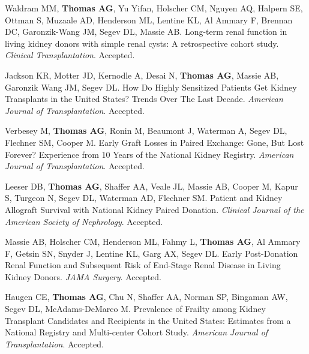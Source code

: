 \documentclass[10pt]{article}
\makeatletter
\newlength{\bibhang}
\newlength{\bibsep}
 {\@listi \global\bibsep\itemsep \global\advance\bibsep by\parsep}
\newenvironment{bibenum*}
  {\renewcommand\labelenumi{[\theenumi]}%
   \etaremune[
     topsep=0pt,
     itemsep=\bibsep,
     parsep=0pt,partopsep=0pt,
     itemindent=-\bibhang,
     leftmargin={\bibhang+\widthof{[999]}}]}
  {\endetaremune}
\newcommand{\pmid}[1]{PMID:\href{https://www.ncbi.nlm.nih.gov/pubmed/#1}{#1}}
\makeatother
\begin{document}
\begin{bibenum*}

\item Waldram MM\dag, \textbf{Thomas AG\dag}, Yu Yifan, Holscher CM,
  Nguyen AQ, Halpern SE, Ottman S, Muzaale AD, Henderson ML, Lentine KL,
  Al Ammary F, Brennan DC, Garonzik-Wang JM, Segev DL, Massie AB.
  Long-term renal function in living kidney donors with simple renal cysts:
  A retrospective cohort study.
  \emph{Clinical Transplantation}. Accepted.

\item Jackson KR\dag, Motter JD\dag, Kernodle A, Desai N, \textbf{Thomas AG},
 Massie AB, Garonzik Wang JM, Segev DL.
 How Do Highly Sensitized Patients Get Kidney Transplants in the
 United States? Trends Over The Last Decade.
  \emph{American Journal of Transplantation}. Accepted.

\item Verbesey M, \textbf{Thomas AG}, Ronin M, Beaumont J, Waterman A,
  Segev DL, Flechner SM, Cooper M. Early Graft Losses in Paired Exchange:
  Gone, But Lost Forever? Experience from 10 Years of the
  National Kidney Registry.
  \emph{American Journal of Transplantation}. Accepted.

\item Leeser DB, \textbf{Thomas AG}, Shaffer AA, Veale JL,
  Massie AB, Cooper M,
  Kapur S, Turgeon N, Segev DL, Waterman AD, Flechner SM.
  Patient and Kidney Allograft Survival with National Kidney Paired Donation.
  \emph{Clinical Journal of the American Society of Nephrology}. Accepted.

\item Massie AB, Holscher CM, Henderson ML, Fahmy L, \textbf{Thomas AG},
  Al Ammary F, Getsin SN, Snyder J, Lentine KL, Garg AX, Segev DL.
  Early Post-Donation Renal Function and Subsequent Risk of End-Stage
  Renal Disease in Living Kidney Donors.
 \emph{JAMA Surgery}. Accepted.

\item Haugen CE\dag, \textbf{Thomas AG\dag}, Chu N, Shaffer AA, Norman SP,
  Bingaman AW, Segev DL, McAdams-DeMarco M.
  Prevalence of Frailty among Kidney Transplant Candidates and Recipients
  in the United States: Estimates from a National Registry and Multi-center
  Cohort Study.
  \emph{American Journal of Transplantation}. Accepted.


\end{bibenum*}
\end{document}
